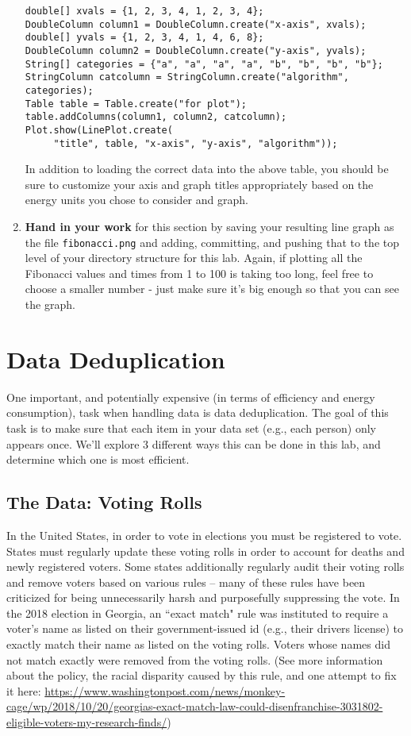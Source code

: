 \documentclass[12pt]{article}
\begin{document}
\begin{enumerate}
\begin{verbatim}
double[] xvals = {1, 2, 3, 4, 1, 2, 3, 4};
DoubleColumn column1 = DoubleColumn.create("x-axis", xvals);
double[] yvals = {1, 2, 3, 4, 1, 4, 6, 8};
DoubleColumn column2 = DoubleColumn.create("y-axis", yvals);
String[] categories = {"a", "a", "a", "a", "b", "b", "b", "b"};
StringColumn catcolumn = StringColumn.create("algorithm", categories);
Table table = Table.create("for plot");
table.addColumns(column1, column2, catcolumn);
Plot.show(LinePlot.create(
     "title", table, "x-axis", "y-axis", "algorithm"));
\end{verbatim}
In addition to loading the correct data into the above table, you should be sure to customize your axis and graph titles appropriately based on the energy units you chose to consider and graph.

\item \textbf{Hand in your work} for this section by saving your resulting line graph as the file \texttt{fibonacci.png} and adding, committing, and pushing that to the top level of your directory structure for this lab.  Again, if plotting all the Fibonacci values and times from 1 to 100 is taking too long, feel free to choose a smaller number - just make sure it's big enough so that you can see the graph.
\end{enumerate}

\section{Data Deduplication}
One important, and potentially expensive (in terms of efficiency and energy consumption), task when handling data is data deduplication. The goal of this task is to make sure that each item in your data set (e.g., each person) only appears once. We'll explore 3 different ways this can be done in this lab, and determine which one is most efficient.

\subsection{The Data: Voting Rolls}
In the United States, in order to vote in elections you must be registered to vote.  States must regularly update these voting rolls in order to account for deaths and newly registered voters.  Some states additionally regularly audit their voting rolls and remove voters based on various rules -- many of these rules have been criticized for being unnecessarily harsh and purposefully suppressing the vote.  In the 2018 election in Georgia, an ``exact match" rule was instituted to require a voter's name as listed on their government-issued id (e.g., their drivers license) to exactly match their name as listed on the voting rolls.  Voters whose names did not match exactly were removed from the voting rolls.  (See more information about the policy, the racial disparity caused by this rule, and one attempt to fix it here: \url{https://www.washingtonpost.com/news/monkey-cage/wp/2018/10/20/georgias-exact-match-law-could-disenfranchise-3031802-eligible-voters-my-research-finds/})
\end{document}
